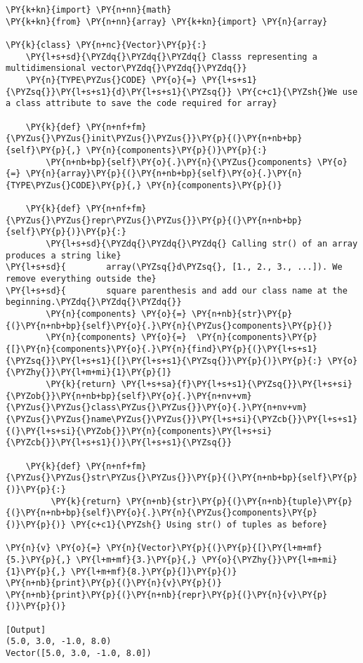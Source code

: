 \begin{Verbatim}[label=\makebox{\url{https://github.com/lucabaldini/cmepda/tree/master/slides/latex/snippets/vector.py}},commandchars=\\\{\}]
\PY{k+kn}{import} \PY{n+nn}{math}
\PY{k+kn}{from} \PY{n+nn}{array} \PY{k+kn}{import} \PY{n}{array}

\PY{k}{class} \PY{n+nc}{Vector}\PY{p}{:}
    \PY{l+s+sd}{\PYZdq{}\PYZdq{}\PYZdq{} Classs representing a multidimensional vector\PYZdq{}\PYZdq{}\PYZdq{}}
    \PY{n}{TYPE\PYZus{}CODE} \PY{o}{=} \PY{l+s+s1}{\PYZsq{}}\PY{l+s+s1}{d}\PY{l+s+s1}{\PYZsq{}} \PY{c+c1}{\PYZsh{}We use a class attribute to save the code required for array}

    \PY{k}{def} \PY{n+nf+fm}{\PYZus{}\PYZus{}init\PYZus{}\PYZus{}}\PY{p}{(}\PY{n+nb+bp}{self}\PY{p}{,} \PY{n}{components}\PY{p}{)}\PY{p}{:}
        \PY{n+nb+bp}{self}\PY{o}{.}\PY{n}{\PYZus{}components} \PY{o}{=} \PY{n}{array}\PY{p}{(}\PY{n+nb+bp}{self}\PY{o}{.}\PY{n}{TYPE\PYZus{}CODE}\PY{p}{,} \PY{n}{components}\PY{p}{)}

    \PY{k}{def} \PY{n+nf+fm}{\PYZus{}\PYZus{}repr\PYZus{}\PYZus{}}\PY{p}{(}\PY{n+nb+bp}{self}\PY{p}{)}\PY{p}{:}
        \PY{l+s+sd}{\PYZdq{}\PYZdq{}\PYZdq{} Calling str() of an array produces a string like}
\PY{l+s+sd}{        array(\PYZsq{}d\PYZsq{}, [1., 2., 3., ...]). We remove everything outside the}
\PY{l+s+sd}{        square parenthesis and add our class name at the beginning.\PYZdq{}\PYZdq{}\PYZdq{}}
        \PY{n}{components} \PY{o}{=} \PY{n+nb}{str}\PY{p}{(}\PY{n+nb+bp}{self}\PY{o}{.}\PY{n}{\PYZus{}components}\PY{p}{)}
        \PY{n}{components} \PY{o}{=}  \PY{n}{components}\PY{p}{[}\PY{n}{components}\PY{o}{.}\PY{n}{find}\PY{p}{(}\PY{l+s+s1}{\PYZsq{}}\PY{l+s+s1}{[}\PY{l+s+s1}{\PYZsq{}}\PY{p}{)}\PY{p}{:} \PY{o}{\PYZhy{}}\PY{l+m+mi}{1}\PY{p}{]}
        \PY{k}{return} \PY{l+s+sa}{f}\PY{l+s+s1}{\PYZsq{}}\PY{l+s+si}{\PYZob{}}\PY{n+nb+bp}{self}\PY{o}{.}\PY{n+nv+vm}{\PYZus{}\PYZus{}class\PYZus{}\PYZus{}}\PY{o}{.}\PY{n+nv+vm}{\PYZus{}\PYZus{}name\PYZus{}\PYZus{}}\PY{l+s+si}{\PYZcb{}}\PY{l+s+s1}{(}\PY{l+s+si}{\PYZob{}}\PY{n}{components}\PY{l+s+si}{\PYZcb{}}\PY{l+s+s1}{)}\PY{l+s+s1}{\PYZsq{}}

    \PY{k}{def} \PY{n+nf+fm}{\PYZus{}\PYZus{}str\PYZus{}\PYZus{}}\PY{p}{(}\PY{n+nb+bp}{self}\PY{p}{)}\PY{p}{:}
         \PY{k}{return} \PY{n+nb}{str}\PY{p}{(}\PY{n+nb}{tuple}\PY{p}{(}\PY{n+nb+bp}{self}\PY{o}{.}\PY{n}{\PYZus{}components}\PY{p}{)}\PY{p}{)} \PY{c+c1}{\PYZsh{} Using str() of tuples as before}

\PY{n}{v} \PY{o}{=} \PY{n}{Vector}\PY{p}{(}\PY{p}{[}\PY{l+m+mf}{5.}\PY{p}{,} \PY{l+m+mf}{3.}\PY{p}{,} \PY{o}{\PYZhy{}}\PY{l+m+mi}{1}\PY{p}{,} \PY{l+m+mf}{8.}\PY{p}{]}\PY{p}{)}
\PY{n+nb}{print}\PY{p}{(}\PY{n}{v}\PY{p}{)}
\PY{n+nb}{print}\PY{p}{(}\PY{n+nb}{repr}\PY{p}{(}\PY{n}{v}\PY{p}{)}\PY{p}{)}

[Output]
(5.0, 3.0, -1.0, 8.0)
Vector([5.0, 3.0, -1.0, 8.0])
\end{Verbatim}
